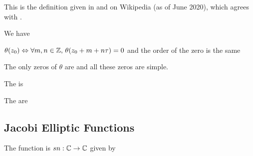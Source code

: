 \documentclass{article}
\begin{document}
\begin{remark}
	This is the definition given in \cite{Miranda1995} and on Wikipedia (as of June 2020), which agrees with \cite{Farkas1992}. 
\end{remark}

\begin{prop}
	We have 
\end{prop}

\begin{corollary}
	$\theta(z_0) \Leftrightarrow \forall m,n \in \mathbb{Z}, \, \theta(z_0 + m + n\tau)=0$ and the order of the zero is the same
\end{corollary}

\begin{prop}
	The only zeros of $\theta$ are 
	and all these zeros are simple. 
\end{prop}

\begin{definition}
	The  is 
\end{definition}

\begin{definition}
	The  are 
\end{definition}
\subsection{Jacobi Elliptic Functions}

\begin{definition}
	The  function is $sn:\mathbb{C} \to \mathbb{C}$ given by 
\end{definition}

\subsection{}
\end{document}
